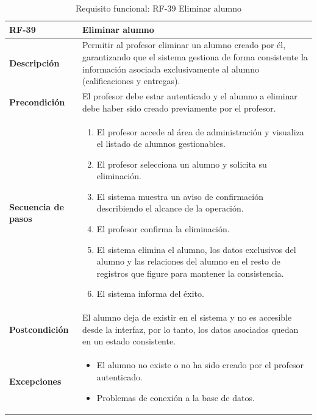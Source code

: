 \begin{table}[H]
\centering
\begin{tabularx}{\textwidth}{
  |>{\centering\arraybackslash}l
  |>{\centering\arraybackslash}X|}
\hline
\textbf{RF-39} & \textbf{Eliminar alumno} \\ \hline
\textbf{Descripción} & Permitir al profesor eliminar un alumno creado por él, garantizando que el sistema gestiona de forma consistente la información asociada exclusivamente al alumno (calificaciones y entregas). \\ \hline
\textbf{Precondición} & El profesor debe estar autenticado y el alumno a eliminar debe haber sido creado previamente por el profesor. \\ \hline
\textbf{Secuencia de pasos} &
\begin{enumerate}
  \item El profesor accede al área de administración y visualiza el listado de alumnos gestionables.
  \item El profesor selecciona un alumno y solicita su eliminación.
  \item El sistema muestra un aviso de confirmación describiendo el alcance de la operación.
  \item El profesor confirma la eliminación.
  \item El sistema elimina el alumno, los datos exclusivos del alumno y las relaciones del alumno en el resto de registros que figure para mantener la consistencia.
  \item El sistema informa del éxito.
\end{enumerate} \\ \hline
\textbf{Postcondición} & El alumno deja de existir en el sistema y no es accesible desde la interfaz, por lo tanto, los datos asociados quedan en un estado consistente. \\ \hline
\textbf{Excepciones} &
\begin{itemize}
  \item {El alumno no existe o no ha sido creado por el profesor autenticado.}
  \item {Problemas de conexión a la base de datos.}
\end{itemize} \\ \hline
\end{tabularx}
\caption{Requisito funcional: RF-39 Eliminar alumno}
\end{table}


